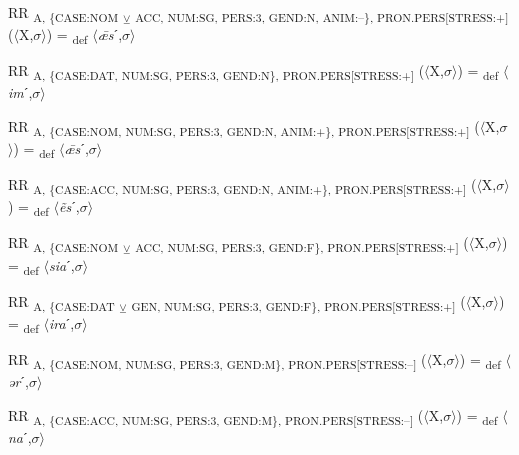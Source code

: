 {\begin{exe}
 RR \textsubscript{A, \{CASE:NOM} \textsubscript{${\veebar}$}\textsubscript{ ACC, NUM:SG, PERS:3, GEND:N, ANIM:–\}, PRON.PERS[STRESS:+]} ($\langle$X,$\sigma $$\rangle$) = \textsubscript{def} $\langle$\textit{ǣs}ˊ,$\sigma $$\rangle$
\end{exe}

\begin{exe}
 RR \textsubscript{A, \{CASE:DAT, NUM:SG, PERS:3, GEND:N\}, PRON.PERS[STRESS:+]} ($\langle$X,$\sigma $$\rangle$) = \textsubscript{def} $\langle$\textit{im}ˊ,$\sigma $$\rangle$
\end{exe}

\begin{exe}
 RR \textsubscript{A, \{CASE:NOM, NUM:SG, PERS:3, GEND:N, ANIM:+\}, PRON.PERS[STRESS:+]} ($\langle$X,$\sigma $$\rangle$) = \textsubscript{def} $\langle$\textit{ǣs}ˊ,$\sigma $$\rangle$
\end{exe}

\begin{exe}
 RR \textsubscript{A, \{CASE:ACC, NUM:SG, PERS:3, GEND:N, ANIM:+\}, PRON.PERS[STRESS:+]} ($\langle$X,$\sigma $$\rangle$) = \textsubscript{def} $\langle$\textit{ẽs}ˊ,$\sigma $$\rangle$
\end{exe}

\begin{exe}
 RR \textsubscript{A, \{CASE:NOM} \textsubscript{${\veebar}$}\textsubscript{ ACC, NUM:SG, PERS:3, GEND:F\}, PRON.PERS[STRESS:+]} ($\langle$X,$\sigma $$\rangle$) = \textsubscript{def} $\langle$\textit{sia}ˊ,$\sigma $$\rangle$
\end{exe}

\begin{exe}
 RR \textsubscript{A, \{CASE:DAT} \textsubscript{${\veebar}$}\textsubscript{ GEN, NUM:SG, PERS:3, GEND:F\}, PRON.PERS[STRESS:+]} ($\langle$X,$\sigma $$\rangle$) = \textsubscript{def} $\langle$\textit{ira}ˊ,$\sigma $$\rangle$
\end{exe}

\begin{exe}
 RR \textsubscript{A, \{CASE:NOM, NUM:SG, PERS:3, GEND:M\}, PRON.PERS[STRESS:–]} ($\langle$X,$\sigma $$\rangle$) = \textsubscript{def} $\langle$\textit{ər}ˊ,$\sigma $$\rangle$
\end{exe}

\begin{exe}
 RR \textsubscript{A, \{CASE:ACC, NUM:SG, PERS:3, GEND:M\}, PRON.PERS[STRESS:–]} ($\langle$X,$\sigma $$\rangle$) = \textsubscript{def} $\langle$\textit{na}ˊ,$\sigma $$\rangle$
\end{exe}

}
